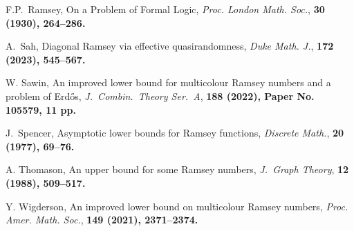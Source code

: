 \begin{thebibliography}{9}
 F.P.~Ramsey, 
On a Problem of Formal Logic, 
\emph{Proc. London Math. Soc.}, \bf 30 \rm (1930), 264--286.

 A.~Sah, 
Diagonal Ramsey via effective quasirandomness, 
\emph{Duke Math. J.}, \bf 172 \rm (2023), 545--567.

 W. Sawin, 
An improved lower bound for multicolour Ramsey numbers and a problem of Erd\H{o}s, 
\emph{J.~Combin.~Theory Ser.~A}, \bf 188 \rm (2022), Paper No. 105579, 11 pp.

 J.~Spencer, 
Asymptotic lower bounds for Ramsey functions, 
\emph{Discrete Math.}, \bf 20 \rm (1977), 69--76. 

 A. Thomason, 
An upper bound for some Ramsey numbers, 
\emph{J.~Graph Theory}, \bf 12 \rm (1988), 509--517.

 Y. Wigderson, 
An improved lower bound on multicolour Ramsey numbers, 
\emph{Proc. Amer. Math. Soc.}, \bf 149 \rm (2021), 2371--2374.

\end{thebibliography}

